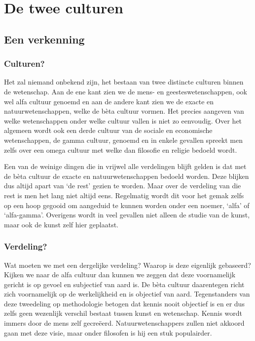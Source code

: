 \chapter{De twee culturen}


\section{Een verkenning}


\subsection{Culturen?}

Het zal niemand onbekend zijn, het bestaan van twee distincte culturen binnen de wetenschap. Aan de ene kant zien we de mens- en geesteswetenschappen, ook wel alfa cultuur genoemd en aan de andere kant zien we de exacte en natuurwetenschappen, welke de b\`eta cultuur vormen. Het precies aangeven van welke wetenschappen onder welke cultuur vallen is niet zo eenvoudig. Over het algemeen wordt ook een derde cultuur van de sociale en economische wetenschappen, de gamma cultuur, genoemd en in enkele gevallen spreekt men zelfs over een omega cultuur met welke dan filosofie en religie bedoeld wordt.

Een van de weinige dingen die in vrijwel alle verdelingen blijft gelden is dat met de b\`eta cultuur de exacte en natuurwetenschappen bedoeld worden. Deze blijken dus altijd apart van `de rest' gezien te worden. Maar over de verdeling van die rest is men het lang niet altijd eens. Regelmatig wordt dit voor het gemak zelfs op een hoop gegooid om aangeduid te kunnen worden onder een noemer, `alfa' of `alfa-gamma'. Overigens wordt in veel gevallen niet alleen de studie van de kunst, maar ook de kunst zelf hier geplaatst.


\subsection{Verdeling?}

Wat moeten we met een dergelijke verdeling? Waarop is deze eigenlijk gebaseerd? Kijken we naar de alfa cultuur dan kunnen we zeggen dat deze voornamelijk gericht is op gevoel en subjectief van aard is. De b\`eta cultuur daarentegen richt zich voornamelijk op de werkelijkheid en is objectief van aard. Tegenstanders van deze tweedeling op methodologie betogen dat kennis nooit objectief is en er dus zelfs geen wezenlijk verschil bestaat tussen kunst en wetenschap. Kennis wordt immers door de mens zelf gecre\"eerd. Natuurwetenschappers zullen niet akkoord gaan met deze visie, maar onder filosofen is hij een stuk populairder.

